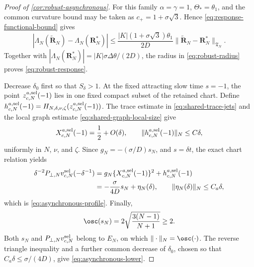 \begin{proof}[Proof of \cref{cor:robust-asynchronous}]
For this family \(\alpha=\gamma=1\), \(\Theta_*=\theta_1\), and the common
curvature bound may be taken as \(c_+=1+\sigma\sqrt3\).  Hence
\cref{eq:response-functional-bound} gives
\[
 |\Lambda_N(\widetilde{\mathbf R}_N)
       -\Lambda_N(\mathbf R_N^*)|
 \le \frac{|K|(1+\sigma\sqrt3)\theta_1}{2D}
       \|\widetilde{\mathbf R}_N-\mathbf R_N^*\|_{\mathfrak T_N}.
\]
Together with
\(|\Lambda_N(\mathbf R_N^*)|=|K|\sigma\Delta\theta/(2D)\), the radius in
\cref{eq:robust-radius} proves \cref{eq:robust-response}.

Decrease \(\delta_0\) first so that \(S_\delta>1\).  At the fixed attracting
slow time \(s=-1\), the point \(z^{a,\rm sel}_{c,N}(-1)\) lies in one fixed
compact subset of the retained chart.  Define
\(h^{a,\rm sel}_{c,N}(-1)
=H_{N,\delta,\nu,\zeta}(z^{a,\rm sel}_{c,N}(-1))\).
The trace estimate in \cref{eq:shared-trace-jets} and the local graph estimate
\cref{eq:shared-graph-local-size} give
\[
 X^{a,\rm sel}_{c,N}(-1)=\frac12+O(\delta),
 \qquad \|h^{a,\rm sel}_{c,N}(-1)\|_N\le C\delta,
\]
uniformly in \(N\), \(\nu\), and \(\zeta\).  Since
\(g_N=-(\sigma/D)s_N\), and \(s=\delta t\), the exact chart relation yields
\begin{align*}
 \delta^{-2}P_{\perp,N}v^{\rm sel}_{c,N}(-\delta^{-1})
 &=g_N\{X^{a,\rm sel}_{c,N}(-1)\}^2
      +h^{a,\rm sel}_{c,N}(-1)\\
 &=-\frac{\sigma}{4D}s_N+\eta_N(\delta),
 \qquad \|\eta_N(\delta)\|_N\le C_a\delta,
\end{align*}
which is \cref{eq:asynchronous-profile}.  Finally,
\[
 \osc(s_N)=2\sqrt{\frac{3(N-1)}{N+1}}\ge2.
\]
Both \(s_N\) and \(P_{\perp,N}v^{\rm sel}_{c,N}\) belong to \(E_N\), on
which \(\|\cdot\|_N=\osc(\cdot)\).  The reverse triangle inequality and a
further common decrease of \(\delta_0\), chosen so that
\(C_a\delta\le\sigma/(4D)\), give \cref{eq:asynchronous-lower}.
\end{proof}

